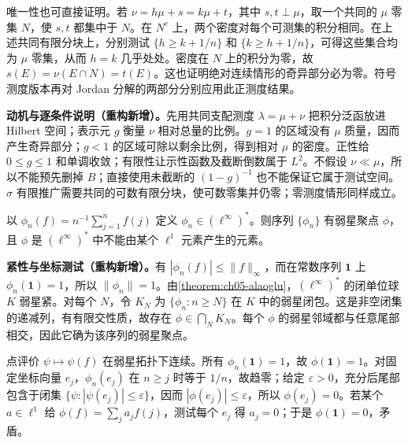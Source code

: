 \documentclass[../../main.tex]{subfiles}
\begin{document}
\begin{solution}
唯一性也可直接证明。若 $\nu=h\mu+s=k\mu+t$，其中 $s,t\perp\mu$，取一个共同的 $\mu$ 零集 $N$，使 $s,t$ 都集中于 $N$。在 $N^c$ 上，两个密度对每个可测集的积分相同。在上述共同有限分块上，分别测试 $\{h\geqslant k+1/n\}$ 和 $\{k\geqslant h+1/n\}$，可得这些集合均为 $\mu$ 零集，从而 $h=k$ 几乎处处。密度在 $N$ 上的积分为零，故 $s(E)=\nu(E\cap N)=t(E)$。这也证明绝对连续情形的奇异部分必为零。符号测度版本再对 Jordan 分解的两部分分别应用此正测度结果。
\end{solution}
\begin{remark}
\textbf{动机与逐条件说明（重构新增）。}先用共同支配测度 $\lambda=\mu+\nu$ 把积分泛函放进 Hilbert 空间；表示元 $g$ 衡量 $\nu$ 相对总量的比例。$g=1$ 的区域没有 $\mu$ 质量，因而产生奇异部分；$g<1$ 的区域可除以剩余比例，得到相对 $\mu$ 的密度。正性给 $0\leqslant g\leqslant1$ 和单调收敛；有限性让示性函数及截断倒数属于 $L^2$。不假设 $\nu\ll\mu$，所以不能预先删掉 $B$；直接使用未截断的 $(1-g)^{-1}$ 也不能保证它属于测试空间。$\sigma$ 有限推广需要共同的可数有限分块，使可数零集并仍零；零测度情形同样成立。
\end{remark}
\begin{exercise}\label{exercise:ch06-linfty-dual-cluster}
以 $\phi_n(f)=n^{-1}\sum_{j=1}^nf(j)$ 定义 $\phi_n\in(\ell^\infty)^*$。则序列 $\{\phi_n\}$ 有弱星聚点 $\phi$，且 $\phi$ 是 $(\ell^\infty)^*$ 中不能由某个 $\ell^1$ 元素产生的元素。
\end{exercise}
\begin{solution}
\textbf{紧性与坐标测试（重构新增）。}有 $|\phi_n(f)|\leqslant\|f\|_\infty$，而在常数序列 $\boldsymbol1$ 上 $\phi_n(\boldsymbol1)=1$，所以 $\|\phi_n\|=1$。由\cref{theorem:ch05-alaoglu}，$(\ell^\infty)^*$ 的闭单位球 $K$ 弱星紧。对每个 $N$，令 $K_N$ 为 $\{\phi_n:n\geqslant N\}$ 在 $K$ 中的弱星闭包。这是非空闭集的递减列，有有限交性质，故存在 $\phi\in\bigcap_NK_N$。每个 $\phi$ 的弱星邻域都与任意尾部相交，因此它确为该序列的弱星聚点。

点评价 $\psi\mapsto\psi(f)$ 在弱星拓扑下连续。所有 $\phi_n(\boldsymbol1)=1$，故 $\phi(\boldsymbol1)=1$。对固定坐标向量 $e_j$，$\phi_n(e_j)$ 在 $n\geqslant j$ 时等于 $1/n$，故趋零；给定 $\varepsilon>0$，充分后尾部包含于闭集 $\{\psi:|\psi(e_j)|\leqslant\varepsilon\}$，因而 $|\phi(e_j)|\leqslant\varepsilon$，所以 $\phi(e_j)=0$。若某个 $a\in\ell^1$ 给 $\phi(f)=\sum_ja_jf(j)$，测试每个 $e_j$ 得 $a_j=0$；于是 $\phi(\boldsymbol1)=0$，矛盾。
\end{solution}
\end{document}

